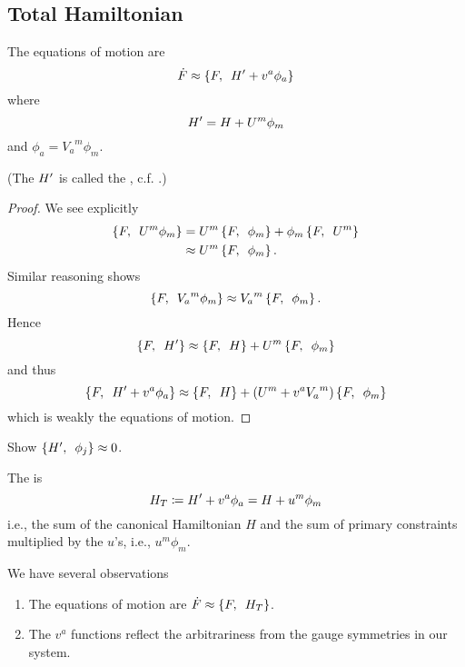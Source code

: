 \subsection{Total Hamiltonian}
\begin{thm}\label{thm:constrained:total-hamiltonian-eqns-of-motion}
The equations of motion are
\begin{equation}
\dot{F}\approx\left\{F,\enspace H'+v^{a}\phi_{a}\right\}
\end{equation}
where
\begin{equation}
  H' = H + U^{m}\phi_{m}
\end{equation}
and $\phi_{a} = {V_{a}}^{m}\phi_{m}$.
\end{thm}
(The $H'$ is called the , c.f. .)
\begin{proof}
We see explicitly
\begin{equation}
  \begin{split}
\left\{F,\enspace U^{m}\phi_{m}\right\}&=U^{m}\left\{F,\enspace\phi_{m}\right\}
  + \phi_{m}\left\{F,\enspace U^{m}\right\}\\
&\approx U^{m}\left\{F,\enspace\phi_{m}\right\}.
  \end{split}
\end{equation}
Similar reasoning shows
\begin{equation}
  \left\{F,\enspace{V_{a}}^{m}\phi_{m}\right\}\approx {V_{a}}^{m}\left\{F,\enspace\phi_{m}\right\}.
\end{equation}
Hence
\begin{equation}
  \left\{F,\enspace H'\right\}\approx\left\{F,\enspace H\right\}+U^{m}\left\{F,\enspace\phi_{m}\right\}
\end{equation}
and thus
\begin{equation}
\left\{F,\enspace H'+v^{a}\phi_{a}\right\}\approx\left\{F,\enspace H\right\}+(U^{m}+v^{a}{V_{a}}^{m})\left\{F,\enspace\phi_{m}\right\}  
\end{equation}
which is weakly the equations of motion.
\end{proof}
\begin{xca}
Show $\left\{H',\enspace\phi_{j}\right\}\approx0$.
\end{xca}
\begin{defn}
  The  is
  \begin{equation}
    H_{T} \coloneqq H' + v^{a}\phi_{a} = H + u^{m}\phi_{m}
  \end{equation}
  i.e., the sum of the canonical Hamiltonian $H$ and the sum of primary
  constraints multiplied by the $u$'s, i.e., $u^{m}\phi_{m}$.
\end{defn}
 We have several observations
\begin{enumerate}
\item The equations of motion are
  $\dot{F}\approx\left\{F,\enspace H_{T}\right\}$.
\item The $v^{a}$ functions reflect the arbitrariness from the gauge
  symmetries in our system.
\end{enumerate}

